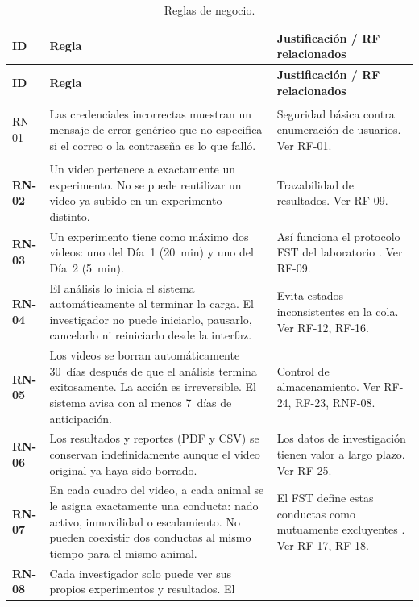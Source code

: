 \begin{longtable}{|>{\bfseries}p{1.1cm}|p{8.1cm}|p{3.9cm}|}
\caption{Reglas de negocio.
\label{tab:rn}}\\
\hline
\textbf{ID} & \textbf{Regla} & \textbf{Justificación / RF relacionados} \\
\hline
\endfirsthead
\hline
\textbf{ID} & \textbf{Regla} & \textbf{Justificación / RF relacionados} \\
\hline
\endhead
\hline
\endfoot

RN-01 & Las credenciales incorrectas muestran un mensaje de error genérico que no
        especifica si el correo o la contraseña es lo que falló.
      & Seguridad básica contra enumeración de usuarios. Ver RF-01. \\
\hline
RN-02 & Un video pertenece a exactamente un experimento. No se puede reutilizar un
        video ya subido en un experimento distinto.
      & Trazabilidad de resultados. Ver RF-09. \\
\hline
RN-03 & Un experimento tiene como máximo dos videos: uno del Día~1 (20~min) y uno
        del Día~2 (5~min).
      & Así funciona el protocolo FST del laboratorio \cite{slattery2012}. Ver RF-09. \\
\hline
RN-04 & El análisis lo inicia el sistema automáticamente al terminar la carga. El
        investigador no puede iniciarlo, pausarlo, cancelarlo ni reiniciarlo desde
        la interfaz.
      & Evita estados inconsistentes en la cola. Ver RF-12, RF-16. \\
\hline
RN-05 & Los videos se borran automáticamente 30~días después de que el análisis
        termina exitosamente. La acción es irreversible. El sistema avisa con al
        menos 7~días de anticipación.
      & Control de almacenamiento. Ver RF-24, RF-23, RNF-08. \\
\hline
RN-06 & Los resultados y reportes (PDF y CSV) se conservan indefinidamente aunque
        el video original ya haya sido borrado.
      & Los datos de investigación tienen valor a largo plazo. Ver RF-25. \\
\hline
RN-07 & En cada cuadro del video, a cada animal se le asigna exactamente una
        conducta: nado activo, inmovilidad o escalamiento. No pueden coexistir dos
        conductas al mismo tiempo para el mismo animal.
      & El FST define estas conductas como mutuamente excluyentes
        \cite{armario2021,cryan2005}. Ver RF-17, RF-18. \\
\hline
RN-08 & Cada investigador solo puede ver sus propios experimentos y resultados. El

\end{longtable}
